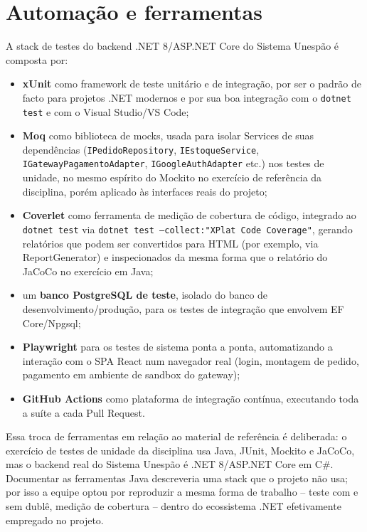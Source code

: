 \documentclass[a4paper,12pt,oneside,openany]{book}
\begin{document}
\section{Automação e ferramentas}

A stack de testes do backend .NET 8/ASP.NET Core do Sistema Unespão é composta por:

\begin{itemize}
    \item \textbf{xUnit} como framework de teste unitário e de integração, por ser o padrão de facto para projetos .NET modernos e por sua boa integração com o \texttt{dotnet test} e com o Visual Studio/VS Code;
    \item \textbf{Moq} como biblioteca de mocks, usada para isolar Services de suas dependências (\texttt{IPedidoRepository}, \texttt{IEstoqueService}, \texttt{IGatewayPagamentoAdapter}, \texttt{IGoogleAuthAdapter} etc.) nos testes de unidade, no mesmo espírito do Mockito no exercício de referência da disciplina, porém aplicado às interfaces reais do projeto;
    \item \textbf{Coverlet} como ferramenta de medição de cobertura de código, integrado ao \texttt{dotnet test} via \texttt{dotnet test --collect:"XPlat Code Coverage"}, gerando relatórios que podem ser convertidos para HTML (por exemplo, via ReportGenerator) e inspecionados da mesma forma que o relatório do JaCoCo no exercício em Java;
    \item um \textbf{banco PostgreSQL de teste}, isolado do banco de desenvolvimento/produção, para os testes de integração que envolvem EF Core/Npgsql;
    \item \textbf{Playwright} para os testes de sistema ponta a ponta, automatizando a interação com o SPA React num navegador real (login, montagem de pedido, pagamento em ambiente de sandbox do gateway);
    \item \textbf{GitHub Actions} como plataforma de integração contínua, executando toda a suíte a cada Pull Request.
\end{itemize}

Essa troca de ferramentas em relação ao material de referência é deliberada: o exercício de testes de unidade da disciplina usa Java, JUnit, Mockito e JaCoCo, mas o backend real do Sistema Unespão é .NET 8/ASP.NET Core em C\#. Documentar as ferramentas Java descreveria uma stack que o projeto não usa; por isso a equipe optou por reproduzir a mesma forma de trabalho -- teste com e sem dublê, medição de cobertura -- dentro do ecossistema .NET efetivamente empregado no projeto.
\end{document}
